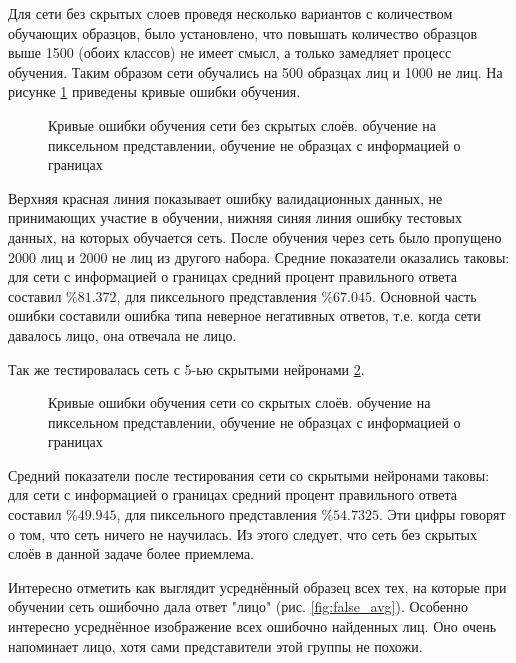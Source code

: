 \documentclass[12pt]{report}
\begin{document}
Для сети без скрытых слоев проведя несколько вариантов с количеством обучающих образцов, было установлено, что 
повышать количество образцов выше 1500 (обоих классов) не имеет смысл, а только замедляет процесс обучения. Таким 
образом сети обучались на 500 образцах лиц и 1000 не лиц. На рисунке \ref{fig:ann_flat_chart} приведены кривые ошибки 
обучения.

\begin{figure}[h]
	\centering
	\caption{Кривые ошибки обучения сети без скрытых слоёв.  обучение на пиксельном представлении, 
 обучение не образцах с информацией о границах}
	\label{fig:ann_flat_chart}
\end{figure}

Верхняя красная линия показывает ошибку валидационных данных, не принимающих участие в обучении, нижняя синяя линия 
ошибку тестовых данных, на которых обучается сеть. После обучения через сеть было пропущено 2000 лиц и 2000 не лиц из 
другого набора. Средние показатели оказались таковы: для сети с информацией о границах средний процент правильного 
ответа составил $\%81.372$, для пиксельного представления $\%67.045$. Основной часть ошибки составили ошибка типа 
неверное негативных ответов, т.е. когда сети давалось лицо, она отвечала не лицо.

Так же тестировалась сеть с 5-ью скрытыми нейронами \ref{fig:ann_hidd_chart}.
\begin{figure}[h]
	\centering
	\caption{Кривые ошибки обучения сети со скрытых слоёв.  обучение на пиксельном представлении, 
 обучение не образцах с информацией о границах}
	\label{fig:ann_hidd_chart}
\end{figure}

Средний показатели после тестирования сети со скрытыми нейронами таковы: для сети с информацией о границах средний 
процент правильного ответа составил $\%49.945$, для пиксельного представления $\%54.7325$. Эти цифры говорят о том, 
что сеть ничего не научилась. Из этого следует, что сеть без скрытых слоёв в данной задаче более приемлема.

Интересно отметить как выглядит усреднённый образец всех тех, на которые при обучении сеть ошибочно дала ответ 
"лицо" (рис. \ref{fig:false_avg}). Особенно интересно усреднённое изображение всех ошибочно найденных лиц. Оно очень 
напоминает лицо, хотя сами представители этой группы не похожи. 
\end{document}
